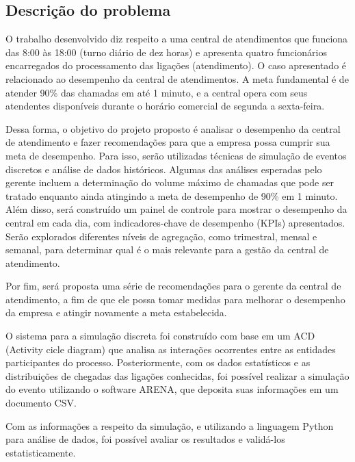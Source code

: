 \subsection{Descrição do problema}
\label{section: descricao}
O trabalho desenvolvido diz respeito a uma central de atendimentos que funciona das 8:00 às 18:00 (turno diário de dez horas) e apresenta quatro funcionários encarregados do processamento das ligações (atendimento). O caso apresentado é relacionado ao desempenho da central de atendimentos. A meta fundamental é de atender 90\% das chamadas em até 1 minuto, e a central opera com seus atendentes disponíveis durante o horário comercial de segunda a sexta-feira.

Dessa forma, o objetivo do projeto proposto é analisar o desempenho da central de atendimento e fazer recomendações para que a empresa possa cumprir sua meta de desempenho. Para isso, serão utilizadas técnicas de simulação de eventos discretos e análise de dados históricos. Algumas das análises esperadas pelo gerente incluem a determinação do volume máximo de chamadas que pode ser tratado enquanto ainda atingindo a meta de desempenho de 90\% em 1 minuto. Além disso, será construído um painel de controle para mostrar o desempenho da central em cada dia, com indicadores-chave de desempenho (KPIs) apresentados. Serão explorados diferentes níveis de agregação, como trimestral, mensal e semanal, para determinar qual é o mais relevante para a gestão da central de atendimento.

Por fim, será proposta uma série de recomendações para o gerente da central de atendimento, a fim de que ele possa tomar medidas para melhorar o desempenho da empresa e atingir novamente a meta estabelecida.

O sistema para a simulação discreta foi construído com base em um ACD (Activity cicle diagram) que analisa as interações ocorrentes entre as entidades participantes do processo. Posteriormente, com os dados estatísticos e as distribuições de chegadas das ligações conhecidas, foi possível realizar a simulação do evento utilizando o software ARENA, que deposita suas informações em um documento CSV. 

Com as informações a respeito da simulação, e utilizando a linguagem Python para análise de dados, foi possível avaliar os resultados e validá-los estatisticamente.

